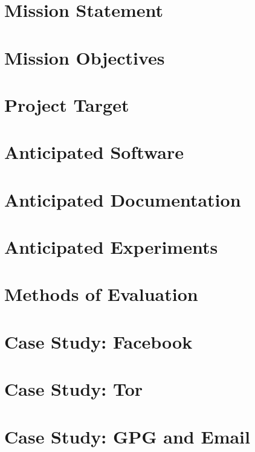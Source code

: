 \chapter{Mission Statement}


\chapter{Mission Objectives}


\chapter{Project Target}


\chapter{Anticipated Software}


\chapter{Anticipated Documentation}


\chapter{Anticipated Experiments}


\chapter{Methods of Evaluation}


\chapter{Case Study: Facebook}


\chapter{Case Study: Tor}


\chapter{Case Study: GPG and Email}


